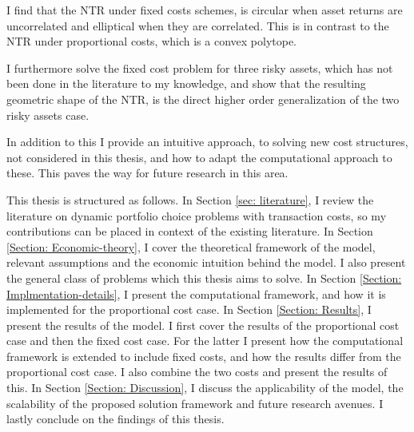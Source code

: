 \documentclass[11pt]{article}
\begin{document}
I find that the NTR under fixed costs schemes, is circular when asset returns are uncorrelated and elliptical when they are correlated.
This is in contrast to the NTR under proportional costs, which is a convex polytope.

I furthermore solve the fixed cost problem for three risky assets, which has not been done in the literature to my knowledge, and show that the resulting geometric shape of the NTR,
is the direct higher order generalization of the two risky assets case.

In addition to this I provide an intuitive approach, to solving new cost structures, not considered in this thesis, and how to adapt the computational approach to these.
This paves the way for future research in this area.

This thesis is structured as follows. In Section \ref{sec: literature}, I review the literature on dynamic portfolio choice problems with transaction costs,
so my contributions can be placed in context of the existing literature.
In Section \ref{Section: Economic-theory}, I cover the theoretical framework of the model, relevant assumptions and the economic intuition behind the model.
I also present the general class of problems which this thesis aims to solve.
In Section \ref{Section: Implmentation-details}, I present the computational framework, and how it is implemented for the proportional cost case.
In Section \ref{Section: Results}, I present the results of the model. I first cover the results of the proportional cost case and then the fixed cost case.
For the latter I present how the computational framework is extended to include fixed costs, and how the results differ from the proportional cost case.
I also combine the two costs and present the results of this.
In Section \ref{Section: Discussion}, I discuss the applicability of the model, the scalability of the proposed solution framework and future research avenues.
I lastly conclude on the findings of this thesis.

\ifdefined\COMPILINGMAIN
\else
\printbibliography
\end{document}
